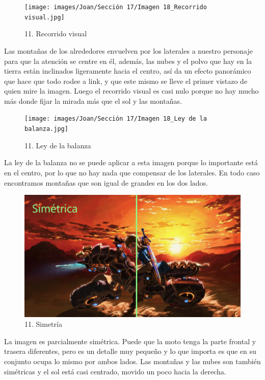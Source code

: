 \documentclass[12pt]{article}
\begin{document}
        \begin{figure}[H]
          \centering
          \texttt{[image: images/Joan/Sección 17/Imagen 18\_Recorrido visual.jpg]}
          \caption{\small 11. Recorrido visual}
        \end{figure}
        Las montañas de los alrededores envuelven por los laterales a nuestro personaje para que la atención se centre en él, además, las nubes y el polvo que hay en la tierra están inclinados ligeramente hacia el centro, así da un efecto panorámico que hace que todo rodee a link, y que este mismo se lleve el primer vistazo de quien mire la imagen. 
    Luego el recorrido visual es casi nulo porque no hay mucho más donde fijar la mirada más que el sol y las montañas. 

    \begin{figure}[H]
          \centering
          \texttt{[image: images/Joan/Sección 17/Imagen 18\_Ley de la balanza.jpg]}
          \caption{\small 11. Ley de la balanza}
        \end{figure}
        La ley de la balanza no se puede aplicar a esta imagen porque lo importante está en el centro, por lo que no hay nada que compensar de los laterales. En todo caso encontramos montañas que son igual de grandes en los dos lados. 

    \begin{figure}[H]
          \centering
          \includegraphics[width=\textwidth]{images/Joan/Sección 17/Imagen 18_Simetría.jpg}
          \caption{\small 11. Simetría}
        \end{figure}
        La imagen es parcialmente simétrica. Puede que la moto tenga la parte frontal y trasera diferentes, pero es un detalle muy pequeño y lo que importa es que en su conjunto ocupa lo mismo por ambos lados. Las montañas y las nubes son también simétricas y el sol está casi centrado, movido un poco hacia la derecha. 
\end{document}
